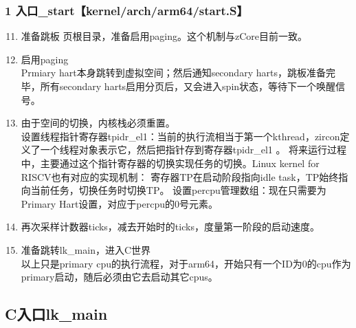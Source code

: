 \documentclass[
8pt, %
]{beamer}
\begin{document}
	\begin{frame}
		\frametitle{1 入口\_start【kernel/arch/arm64/start.S】}
		\begin{enumerate}\setcounter{enumi}{10}
			\item 准备跳板 页根目录，准备启用paging。这个机制与zCore目前一致。
			\item 启用paging\\
			Prmiary hart本身跳转到虚拟空间；然后通知secondary harts，跳板准备完毕，所有secondary harts启用分页后，又会进入spin状态，等待下一个唤醒信号。
			\item 由于空间的切换，内核栈必须重置。\\
			设置线程指针寄存器tpidr\_el1：当前的执行流相当于第一个kthread，zircon定义了一个线程对象表示它，然后把指针存到寄存器tpidr\_el1 。
			将来运行过程中，主要通过这个指针寄存器的切换实现任务的切换。Linux kernel for RISCV也有对应的实现机制：
			寄存器TP在启动阶段指向idle task，TP始终指向当前任务，切换任务时切换TP。
			设置percpu管理数组：现在只需要为Primary Hart设置，对应于percpu的0号元素。
			\item 再次采样计数器ticks，减去开始时的ticks，度量第一阶段的启动速度。
			\item 准备跳转lk\_main，进入C世界\\
			以上只是primary cpu的执行流程，对于arm64，开始只有一个ID为0的cpu作为primary启动，随后必须由它去启动其它cpus。
		\end{enumerate}
	\end{frame}

	\subsection{C入口lk\_main}
\end{document}
